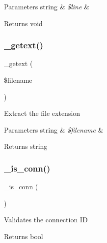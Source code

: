 \begin{DoxyParams}[1]{Parameters}
string & {\em \$line} & \\
\hline
\end{DoxyParams}
\begin{DoxyReturn}{Returns}
void 
\end{DoxyReturn}
\mbox{\label{class_c_i___f_t_p_ab06ef33f96f03cafbb8f2bb6d695ef1f}} 
\subsubsection{\texorpdfstring{\+\_\+getext()}{\_getext()}}
{\footnotesize\ttfamily \+\_\+getext (\begin{DoxyParamCaption}\item[{}]{\$filename }\end{DoxyParamCaption})\hspace{0.3cm}{\ttfamily [protected]}}

Extract the file extension


\begin{DoxyParams}[1]{Parameters}
string & {\em \$filename} & \\
\hline
\end{DoxyParams}
\begin{DoxyReturn}{Returns}
string 
\end{DoxyReturn}
\mbox{\label{class_c_i___f_t_p_af20c08e4b61fe028e032b388cd73936a}} 
\subsubsection{\texorpdfstring{\+\_\+is\+\_\+conn()}{\_is\_conn()}}
{\footnotesize\ttfamily \+\_\+is\+\_\+conn (\begin{DoxyParamCaption}{ }\end{DoxyParamCaption})\hspace{0.3cm}{\ttfamily [protected]}}

Validates the connection ID

\begin{DoxyReturn}{Returns}
bool 
\end{DoxyReturn}
\mbox{\label{class_c_i___f_t_p_a95562e7b8a41561f4b0b525d9c7fe701}} 
